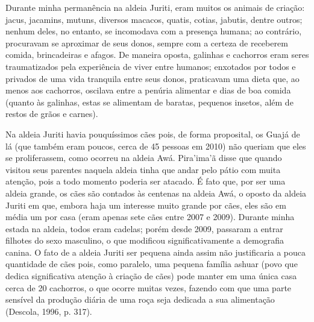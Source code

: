 Durante minha permanência na aldeia Juriti, eram muitos os animais de
criação: jacus, jacamins, mutuns, diversos macacos, quatis, cotias,
jabutis, dentre outros; nenhum deles, no entanto, se incomodava com a
presença humana; ao contrário, procuravam se aproximar de seus donos,
sempre com a certeza de receberem comida, brincadeiras e afagos. De
maneira oposta, galinhas e cachorros eram seres traumatizados pela
experiência de viver entre humanos; enxotados por todos e privados de
uma vida tranquila entre seus donos, praticavam uma dieta que, ao menos
aos cachorros, oscilava entre a penúria alimentar e dias de boa comida
(quanto às galinhas, estas se alimentam de baratas, pequenos insetos,
além de restos de grãos e carnes).

Na aldeia Juriti havia pouquíssimos cães pois, de forma proposital, os
Guajá de lá (que também eram poucos, cerca de 45 pessoas em 2010) não
queriam que eles se proliferassem, como ocorreu na aldeia Awá.
Pira'ima'ã disse que quando visitou seus parentes naquela aldeia tinha
que andar pelo pátio com muita atenção, pois a todo momento poderia ser
atacado. É fato que, por ser uma aldeia grande, os cães são contados às
centenas na aldeia Awá, o oposto da aldeia Juriti em que, embora
haja um interesse muito grande por cães, eles são em média um por casa
(eram apenas sete cães entre 2007 e 2009). Durante minha estada na
aldeia, todos eram cadelas; porém desde 2009, passaram a entrar filhotes
do sexo masculino, o que modificou significativamente a demografia
canina. O fato de a aldeia Juriti ser pequena ainda assim não
justificaria a pouca quantidade de cães pois, como paralelo, uma pequena
família ashuar (povo que dedica significativa atenção à criação de cães)
pode manter em uma única casa cerca de 20 cachorros, o que ocorre muitas
vezes, fazendo com que uma parte sensível da produção diária de uma roça
seja dedicada a sua alimentação (Descola, 1996, p. 317).

